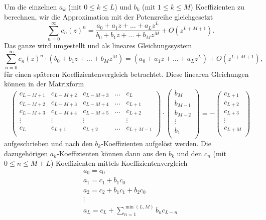 Um die einzelnen $a_k$ (mit $0\leq k\leq L$) und $b_k$ (mit $1\leq k\leq M $) Koeffizienten zu berechnen, wir die Approximation mit der Potenzreihe gleichgesetzt
\begin{equation}
\sum_{n=0}^{\infty} c_{n} (z)^{n} 
=
\frac{a_0 + a_1 z + \dots + a_L z^L}{b_0 + b_1 z + \dots + b_M z^M}
+O(z^{L+M+1}).
\end{equation}
Das ganze wird umgestellt und als lineares Gleichungssystem
\begin{equation}
\sum_{n=0}^{\infty} c_{n} (z)^{n} 
\cdot
(b_0 + b_1 z + \dots + b_M z^M)
=
(a_0 + a_1 z + \dots + a_L z^L) 
+
O(z^{L+M+1}),
\end{equation}
für einen späteren Koeffizientenvergleich betrachtet.
Diese linearen Gleichungen können in der Matrixform 
\[
\renewcommand\arraystretch{1.25}
\begin{pmatrix}
c_{L-M+1} & c_{L-M+2} & c_{L-M+3} &\dots & c_{L}\\
c_{L-M+2} & c_{L-M+3} & c_{L-M+4} &\dots & c_{L+1}\\
c_{L-M+3} & c_{L-M+4} & c_{L-M+5} &\dots & c_{L+2}\\
\vdots & \vdots  & \vdots  &  & \vdots \\
c_{L} & c_{L+1} & c_{L+2} &\dots & c_{L+M-1}\\
\end{pmatrix}
\cdot
\begin{pmatrix}
b_{M}\\
b_{M-1}\\
b_{M-2}\\
\vdots \\
b_{1}\\
\end{pmatrix}
=
-
\begin{pmatrix}
c_{L+1}\\
c_{L+2}\\
c_{L+3}\\
\vdots \\
c_{L+M}\\
\end{pmatrix}
\label{pade:bKoeff}
\]
aufgeschrieben und nach den $b_k$-Koeffizienten aufgelöst werden.
Die dazugehörigen $a_k$-Koeffizienten können dann aus den $b_k$ und den $c_n$ (mit $0\leq n \leq M+L$) Koeffizienten mittels Koeffizientenvergleich
\begin{equation}
\begin{array}{l}
a_{0}=c_{0} \\
a_{1}=c_{1}+b_{1} c_{0} \\
a_{2}=c_{2}+b_{1} c_{1}+b_{2} c_{0} \\
\vdots \\
a_{L}=c_{L}+\displaystyle\sum_{n=1}^{\min (L, M)} b_{n} c_{L-n}
\end{array}
\label{pade:aKoeff}
\end{equation}
